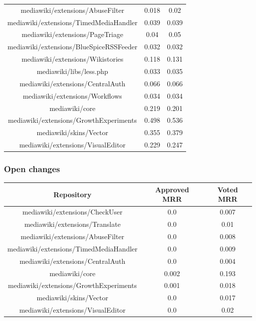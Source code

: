 \begin{center}
\begin{tabular}{@{}c c c@{}}
mediawiki/extensions/AbuseFilter & 0.018 & 0.02 \\
mediawiki/extensions/TimedMediaHandler & 0.039 & 0.039 \\
mediawiki/extensions/PageTriage & 0.04 & 0.05 \\
mediawiki/extensions/BlueSpiceRSSFeeder & 0.032 & 0.032 \\
mediawiki/extensions/Wikistories & 0.118 & 0.131 \\
mediawiki/libs/less.php & 0.033 & 0.035 \\
mediawiki/extensions/CentralAuth & 0.066 & 0.066 \\
mediawiki/extensions/Workflows & 0.034 & 0.034 \\
mediawiki/core & 0.219 & 0.201 \\
mediawiki/extensions/GrowthExperiments & 0.498 & 0.536 \\
mediawiki/skins/Vector & 0.355 & 0.379 \\
mediawiki/extensions/VisualEditor & 0.229 & 0.247 \\
\hline
\end{tabular}
\end{center}

\subsubsection{Open changes}
\hspace{0.25cm}
\begin{center}
\begin{tabular}{@{}c c c@{}} 
 \hline
    \textbf{Repository} & {Approved MRR} & {Voted MRR} \\
\hline
mediawiki/extensions/CheckUser & 0.0 & 0.007 \\
mediawiki/extensions/Translate & 0.0 & 0.01 \\
mediawiki/extensions/AbuseFilter & 0.0 & 0.008 \\
mediawiki/extensions/TimedMediaHandler & 0.0 & 0.009 \\
mediawiki/extensions/CentralAuth & 0.0 & 0.004 \\
mediawiki/core & 0.002 & 0.193 \\
mediawiki/extensions/GrowthExperiments & 0.001 & 0.018 \\
mediawiki/skins/Vector & 0.0 & 0.017 \\
mediawiki/extensions/VisualEditor & 0.0 & 0.02 \\
 \hline
\end{tabular}
\end{center}

